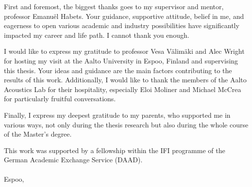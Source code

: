 First and foremost, the biggest thanks goes to my supervisor and mentor, professor Emanu{\"e}l Habets. Your guidance, supportive attitude, belief in me, and eagerness to open various academic and industry possibilities have significantly impacted my career and life path. I cannot thank you enough.

I would like to express my gratitude to professor Vesa V{\"a}lim{\"a}ki and Alec Wright for hosting my visit at the Aalto University in Espoo, Finland and supervising this thesis. Your ideas and guidance are the main factors contributing to the results of this work. Additionally, I would like to thank the members of the Aalto Acoustics Lab for their hospitality, especially Eloi Moliner and Michael McCrea for particularly fruitful conversations.

Finally, I express my deepest gratitude to my parents, who supported me in various ways, not only during the thesis research but also during the whole course of the Master's degree.

This work was supported by a
fellowship within the IFI programme of the German Academic Exchange
Service (DAAD).
\\
\\

Espoo, \myTime \\
\begin{flushright}
    \myName
\end{flushright}


\clearpage